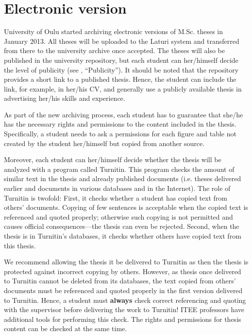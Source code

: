 \section{Electronic version}

University of Oulu started archiving electronic versions of M.Sc. theses in January 2013. All theses will be uploaded to the Laturi system and transferred from there to the university archive once accepted. The theses will also be published in the university repository, but each student can her/himself decide the level of publicity (see , “Publicity”). It should be noted that the repository provides a short link to a published thesis. Hence, the student can include the link, for example, in her/his CV, and generally use a publicly available thesis in advertising her/his skills and experience.

As part of the new archiving process, each student has to guarantee that she/he has the necessary rights and permissions to the content included in the thesis. Specifically, a student needs to ask a permissions for each figure and table not created by the student her/himself but copied from another source.

Moreover, each student can her/himself decide whether the thesis will be analyzed with a program called Turnitin. This program checks the amount of similar text in the thesis and already published documents (i.e. theses delivered earlier and documents in various databases and in the Internet). The role of Turnitin is twofold: First, it checks whether a student has copied text from others’ documents. Copying of few sentences is acceptable when the copied text is referenced and quoted properly; otherwise such copying is not permitted and causes official consequences---the thesis can even be rejected. Second, when the thesis is in Turnitin’s databases, it checks whether others have copied text from this thesis.

We recommend allowing the thesis it be delivered to Turnitin as then the thesis is protected against incorrect copying by others. However, as thesis once delivered to Turnitin cannot be deleted from its databases, the text copied from others’ documents must be referenced and quoted properly in the first version delivered to Turnitin. Hence, a student must \textbf{always} check correct referencing and quoting with the supervisor before delivering the work to Turnitin! ITEE professors have additional tools for performing this check. The rights and permissions for thesis content can be checked at the same time.

